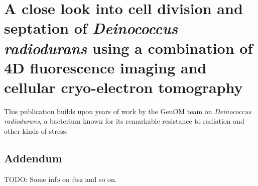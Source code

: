 \chapter[\textit{D. radiodurans}: division and septation]{A close look into cell division and septation of \textit{Deinococcus radiodurans} using a combination of 4D fluorescence imaging and cellular cryo-electron tomography}\label{drad}

This publication builds upon years of work by the GenOM team on \textit{Deinococcus radiodurans}, a bacterium known for its remarkable resistance to radiation and other kinds of stress.

\localtableofcontents




\section{Addendum}

TODO: Some info on ftsz and so on.
